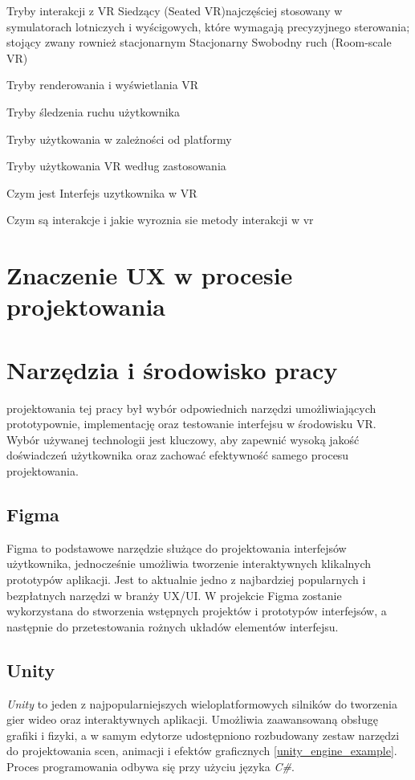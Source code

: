 Tryby interakcji z VR
Siedzący (Seated VR)najczęściej stosowany w symulatorach lotniczych i wyścigowych, które wymagają precyzyjnego sterowania; stojący zwany rownież stacjonarnym
Stacjonarny 
Swobodny ruch (Room-scale VR)

Tryby renderowania i wyświetlania VR

Tryby śledzenia ruchu użytkownika

 Tryby użytkowania w zależności od platformy

 Tryby użytkowania VR według zastosowania

Czym jest Interfejs uzytkownika w VR

Czym są interakcje i jakie wyroznia sie metody interakcji w vr


 \section{Znaczenie UX w procesie projektowania}
 



\section {Narzędzia i środowisko pracy}


 projektowania tej pracy był wybór odpowiednich narzędzi umożliwiających prototypownie, implementację oraz testowanie interfejsu w środowisku VR. Wybór używanej technologii jest kluczowy, aby zapewnić wysoką jakość doświadczeń użytkownika oraz zachować efektywność samego procesu projektowania.

\subsection{Figma}
Figma to podstawowe narzędzie służące do projektowania interfejsów użytkownika, jednocześnie umożliwia tworzenie interaktywnych klikalnych prototypów aplikacji. Jest to aktualnie jedno z najbardziej popularnych i bezpłatnych narzędzi w branży UX/UI. W projekcie Figma zostanie wykorzystana do stworzenia wstępnych projektów i prototypów interfejsów, a następnie do przetestowania rożnych układów elementów interfejsu. 
\subsection{Unity}
\textit{Unity} to jeden z najpopularniejszych wieloplatformowych silników do tworzenia gier wideo oraz interaktywnych aplikacji. Umożliwia zaawansowaną obsługę grafiki i fizyki, a w samym edytorze udostępniono rozbudowany zestaw narzędzi do projektowania scen, animacji i efektów graficznych \ref{unity_engine_example}. Proces programowania odbywa się przy użyciu języka \textit{C\#}.

